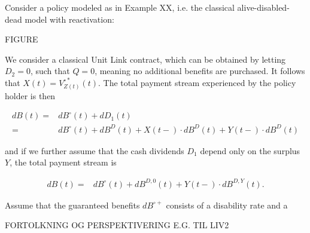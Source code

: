 \documentclass{book}
\newcommand{\1}[1]{\mathbbm{1}_{\left\lbrace #1 \right\rbrace}}
\theoremstyle{break}
\theoremstyle{remark}
\numberwithin{equation}{section}
\begin{document}
\begin{example}
Consider a policy modeled as in Example XX, i.e. the classical alive-disabled-dead model with reactivation:

FIGURE

We consider a classical Unit Link contract, which can be obtained by letting $D_2=0$, such that $Q=0$, meaning no additional benefits are purchased. It follows that $X(t) = V_{Z(t)}^{\circ*}(t)$. The total payment stream experienced by the policy holder is then

\begin{align*}
	dB(t) =& dB^\circ(t) + dD_1(t) \\
	=& dB^\circ(t) + dB^D(t) + X(t-) \cdot dB^D(t) + Y(t-) \cdot dB^D(t)
\end{align*}

and if we further assume that the cash dividends $D_1$ depend only on the surplus $Y$, the total payment stream is

\begin{align*}
	dB(t) =& dB^\circ(t) + dB^{D,0}(t) + Y(t-) \cdot dB^{D,Y}(t).
\end{align*}

Assume that the guaranteed benefits $dB^{\circ+}$ consists of a disability rate and a 

\end{example}

FORTOLKNING OG PERSPEKTIVERING E.G. TIL LIV2
\end{document}
